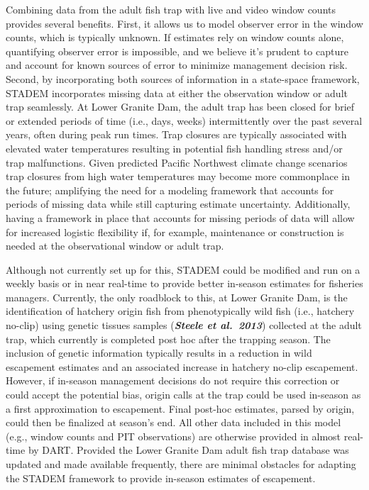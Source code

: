 \documentclass[
  12pt,
]{article}
\begin{document}
Combining data from the adult fish trap with live and video window counts provides several benefits. First, it allows us to model observer error in the window counts, which is typically unknown. If estimates rely on window counts alone, quantifying observer error is impossible, and we believe it's prudent to capture and account for known sources of error to minimize management decision risk. Second, by incorporating both sources of information in a state-space framework, STADEM incorporates missing data at either the observation window or adult trap seamlessly. At Lower Granite Dam, the adult trap has been closed for brief or extended periods of time (i.e., days, weeks) intermittently over the past several years, often during peak run times. Trap closures are typically associated with elevated water temperatures resulting in potential fish handling stress and/or trap malfunctions. Given predicted Pacific Northwest climate change scenarios trap closures from high water temperatures may become more commonplace in the future; amplifying the need for a modeling framework that accounts for periods of missing data while still capturing estimate uncertainty. Additionally, having a framework in place that accounts for missing periods of data will allow for increased logistic flexibility if, for example, maintenance or construction is needed at the observational window or adult trap.

Although not currently set up for this, STADEM could be modified and run on a weekly basis or in near real-time to provide better in-season estimates for fisheries managers. Currently, the only roadblock to this, at Lower Granite Dam, is the identification of hatchery origin fish from phenotypically wild fish (i.e., hatchery no-clip) using genetic tissues samples (\textbf{\emph{Steele et al.~2013}}) collected at the adult trap, which currently is completed post hoc after the trapping season. The inclusion of genetic information typically results in a reduction in wild escapement estimates and an associated increase in hatchery no-clip escapement. However, if in-season management decisions do not require this correction or could accept the potential bias, origin calls at the trap could be used in-season as a first approximation to escapement. Final post-hoc estimates, parsed by origin, could then be finalized at season's end. All other data included in this model (e.g., window counts and PIT observations) are otherwise provided in almost real-time by DART. Provided the Lower Granite Dam adult fish trap database was updated and made available frequently, there are minimal obstacles for adapting the STADEM framework to provide in-season estimates of escapement.
\end{document}
